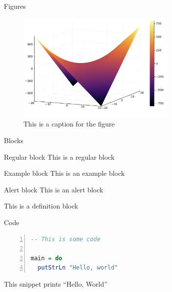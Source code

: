 \documentclass[10pt]{beamer}
\begin{document}
\begin{frame}{Figures}
    \begin{figure}
        \centering
        \includegraphics[width=0.7\textwidth]{
            assets/slides/image-2.png
        }
        \caption{This is a caption for the figure}
        \label{fig:figure-b}
    \end{figure}
\end{frame}

\begin{frame}{Blocks}
  \begin{block}{Regular block}
    This is a regular block
  \end{block}
  
  \begin{exampleblock}{Example block}
    This is an example block
  \end{exampleblock}

  \begin{alertblock}{Alert block}
    This is an alert block
  \end{alertblock}

  \begin{definition}
    This is a definition block
  \end{definition}
\end{frame}

\begin{frame}[fragile]{Code}
\begin{lstlisting}[frame=single,language=Haskell, numbers=left]
-- This is some code

main = do
  putStrLn "Hello, world"
\end{lstlisting}

This snippet prints ``Hello, World''
\end{frame}
\end{document}
